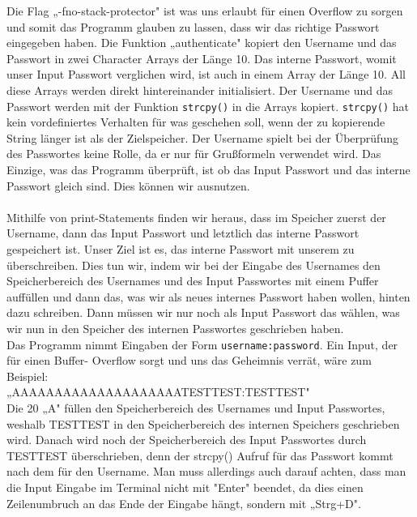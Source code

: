 \documentclass[12pt, a4paper, titlepage, oneside]{scrartcl}
\begin{document}
	Die Flag „-fno-stack-protector" ist was uns erlaubt für einen Overflow zu sorgen und somit das
	Programm glauben zu lassen, dass wir das richtige Passwort eingegeben haben. Die Funktion
	„authenticate" kopiert den Username und das Passwort in zwei Character Arrays der Länge 10. Das
	interne Passwort, womit unser Input Passwort verglichen wird, ist auch in einem Array der Länge
	10. All diese Arrays werden direkt hintereinander initialisiert. Der Username und das Passwort
	werden mit der Funktion \lstinline{strcpy()} in die Arrays kopiert. \lstinline{strcpy()} hat kein vordefiniertes Verhalten für
	was geschehen soll, wenn der zu kopierende String länger ist als der Zielspeicher. Der Username
	spielt bei der Überprüfung des Passwortes keine Rolle, da er nur für Grußformeln verwendet wird.
	Das Einzige, was das Programm überprüft, ist ob das Input Passwort und das interne Passwort
	gleich sind. Dies können wir ausnutzen. \\
	\\
	Mithilfe von print-Statements finden wir heraus, dass im Speicher zuerst der Username, dann das
	Input Passwort und letztlich das interne Passwort gespeichert ist. Unser Ziel ist es, das interne
	Passwort mit unserem zu überschreiben. Dies tun wir, indem wir bei der Eingabe des Usernames
	den Speicherbereich des Usernames und des Input Passwortes mit einem Puffer auffüllen und dann
	das, was wir als neues internes Passwort haben wollen, hinten dazu schreiben. Dann müssen wir nur
	noch als Input Passwort das wählen, was wir nun in den Speicher des internen Passwortes
	geschrieben haben. \\
	Das Programm nimmt Eingaben der Form \lstinline{username:password}. Ein Input, der für einen Buffer-
	Overflow sorgt und uns das Geheimnis verrät, wäre zum Beispiel:\\
	„AAAAAAAAAAAAAAAAAAAATESTTEST:TESTTEST" \\
	Die 20 „A" füllen den Speicherbereich des Usernames und Input Passwortes, weshalb TESTTEST
	in den Speicherbereich des internen Speichers geschrieben wird. Danach wird noch der
	Speicherbereich des Input Passwortes durch TESTTEST überschrieben, denn der strcpy() Aufruf für
	das Passwort kommt nach dem für den Username. Man muss allerdings auch darauf achten, dass
	man die Input Eingabe im Terminal nicht mit "Enter" beendet, da dies einen Zeilenumbruch an das
	Ende der Eingabe hängt, sondern mit „Strg+D".
\end{document}
